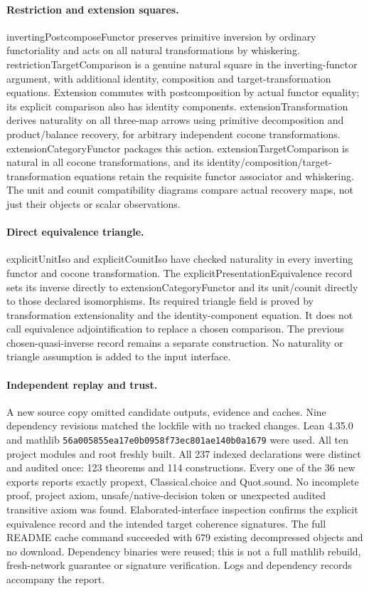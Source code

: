 \documentclass{article}
\begin{document}
\paragraph{Restriction and extension squares.} invertingPostcomposeFunctor preserves primitive inversion by ordinary functoriality and acts on all natural transformations by whiskering. restrictionTargetComparison is a genuine natural square in the inverting-functor argument, with additional identity, composition and target-transformation equations. Extension commutes with postcomposition by actual functor equality; its explicit comparison also has identity components. extensionTransformation derives naturality on all three-map arrows using primitive decomposition and product/balance recovery, for arbitrary independent cocone transformations. extensionCategoryFunctor packages this action. extensionTargetComparison is natural in all cocone transformations, and its identity/composition/target-transformation equations retain the requisite functor associator and whiskering. The unit and counit compatibility diagrams compare actual recovery maps, not just their objects or scalar observations.
\paragraph{Direct equivalence triangle.} explicitUnitIso and explicitCounitIso have checked naturality in every inverting functor and cocone transformation. The explicitPresentationEquivalence record sets its inverse directly to extensionCategoryFunctor and its unit/counit directly to those declared isomorphisms. Its required triangle field is proved by transformation extensionality and the identity-component equation. It does not call equivalence adjointification to replace a chosen comparison. The previous chosen-quasi-inverse record remains a separate construction. No naturality or triangle assumption is added to the input interface.
\paragraph{Independent replay and trust.} A new source copy omitted candidate outputs, evidence and caches. Nine dependency revisions matched the lockfile with no tracked changes. Lean 4.35.0 and mathlib \texttt{56a005855ea17e0b0958f73ec801ae140b0a1679} were used. All ten project modules and root freshly built. All 237 indexed declarations were distinct and audited once: 123 theorems and 114 constructions. Every one of the 36 new exports reports exactly propext, Classical.choice and Quot.sound. No incomplete proof, project axiom, unsafe/native-decision token or unexpected audited transitive axiom was found. Elaborated-interface inspection confirms the explicit equivalence record and the intended target coherence signatures. The full README cache command succeeded with 679 existing decompressed objects and no download. Dependency binaries were reused; this is not a full mathlib rebuild, fresh-network guarantee or signature verification. Logs and dependency records accompany the report.
\end{document}
